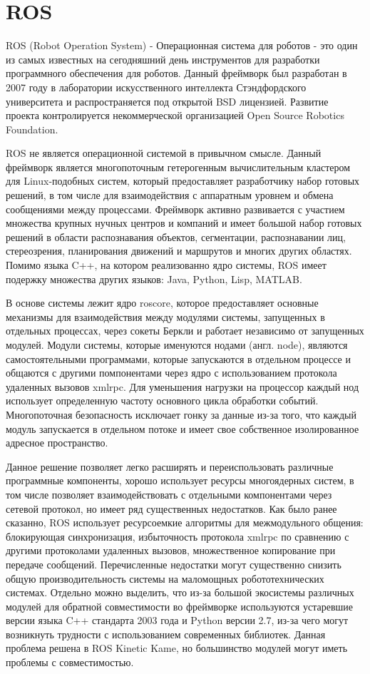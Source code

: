 \section{ROS}

ROS (Robot Operation System) - Операционная система для роботов - это один из самых известных на сегодняшний день инструментов для разработки программного обеспечения для роботов. Данный фреймворк был разработан в 2007 году в лаборатории искусственного интеллекта Стэндфордского университета и распространяется под открытой BSD лицензией. Развитие проекта контролируется некоммерческой организацией Open Source Robotics Foundation.

ROS не является операционной системой в привычном смысле. Данный фреймворк является многопоточным гетерогенным вычислительным кластером для Linux-подобных систем, который предоставляет разработчику набор готовых решений, в том числе для взаимодействия с аппаратным уровнем и обмена сообщениями между процессами. Фреймворк активно развивается с участием множества крупных нучных центров и компаний и имеет большой набор готовых решений в области распознавания объектов, сегментации, распознавании лиц, стереозрения, планирования движений и маршрутов и многих других областях. Помимо языка C++, на котором реализованно ядро системы, ROS имеет подержку множества других языков: Java, Python, Lisp, MATLAB.

В основе системы лежит ядро roscore, которое предоставляет основные механизмы для взаимодействия между модулями системы, запущенных в отдельных процессах, через сокеты Беркли и работает независимо от запущенных модулей. Модули системы, которые именуются нодами (англ. node),  являются самостоятельными программами, которые запускаются в отдельном процессе и общаются с другими помпонентами через ядро с использованием протокола удаленных вызовов xmlrpc. Для уменьшения нагрузки на процессор каждый нод использует определенную частоту основного цикла обработки событий. Многопоточная безопасность исключает гонку за данные из-за того, что каждый модуль запускается в отдельном потоке и имеет свое собственное изолированное адресное пространство.

Данное решение позволяет легко расширять и переиспользовать различные программные компоненты, хорошо использует ресурсы многоядерных систем, в том числе позволяет взаимодействовать с отдельными компонентами через сетевой протокол, но имеет ряд существенных недостатков. Как было ранее сказанно, ROS использует ресурсоемкие алгоритмы для межмодульного общения: блокирующая синхронизация, избыточность протокола xmlrpc по сравнению с другими протоколами удаленных вызовов, множественное копирование при передаче сообщений. Перечисленные недостатки могут существенно снизить общую производительность системы на маломощных робототехнических системах. Отдельно можно выделить, что из-за большой экосистемы различных модулей для обратной совместимости во фреймворке используются устаревшие версии языка C++ стандарта 2003 года и Python версии 2.7, из-за чего могут возникнуть трудности с использованием современных библиотек. Данная проблема решена в ROS Kinetic Kame, но большинство модулей могут иметь проблемы с совместимостью.


